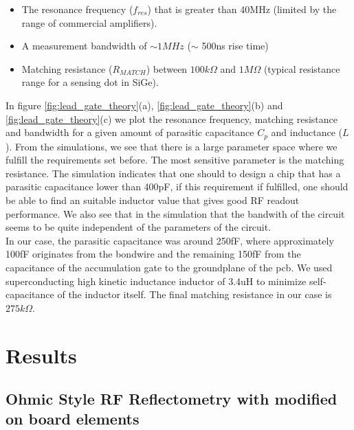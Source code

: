 \documentclass{article}
\begin{document}
	\begin{itemize}
		\item The resonance frequency ($f_{res}$) that is greater than 40MHz (limited by the range of commercial amplifiers).
		\item A measurement bandwidth of $\sim 1MHz$ ($\sim$ 500ns rise time)
		\item Matching resistance ($R_{MATCH}$) between $100k\Omega$ and $1M\Omega$ (typical resistance range for a sensing dot in SiGe).
	\end{itemize}
	 In figure \ref{fig:lead_gate_theory}(a),  \ref{fig:lead_gate_theory}(b) and \ref{fig:lead_gate_theory}(c) we plot the resonance frequency, matching resistance and bandwidth for a given amount of parasitic capacitance $C_p$ and inductance ($L$).
	 From the simulations, we see that there is a large parameter space where we fulfill the requirements set before. The most sensitive parameter is the matching resistance. The simulation indicates that one should to design a chip that has a parasitic capacitance lower than 400pF, if this requirement if fulfilled, one should be able to find an suitable inductor value that gives good RF readout performance. We also see that in the simulation that the bandwith of the circuit seems to be quite independent of the parameters of the circuit.\\
	 In our case, the parasitic capacitance was around 250fF, where approximately 100fF originates from the bondwire and the remaining 150fF from the capacitance of the accumulation gate to the groundplane of the pcb. We used superconducting high kinetic inductance inductor of 3.4uH to minimize self-capacitance of the inductor itself. The final matching resistance in our case is $275k\Omega$.  

\section{Results} %
\label{sec:results}
\subsection{Ohmic Style RF Reflectometry with modified on board elements} %
	\label{sub:ohmic_style_rf_reflectometry_with_modified_on_board_elements}
\end{document}
